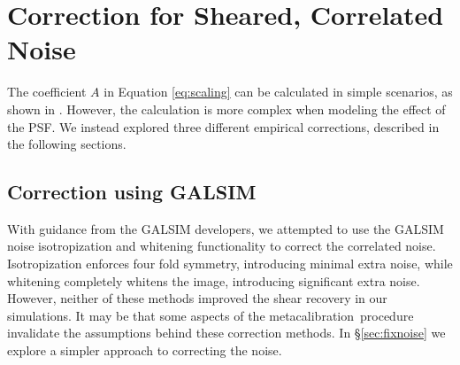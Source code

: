 \documentclass[usegraphicx,usenatbib]{mn2e}
\newcommand{\mcal}{metacalibration}
\newcommand{\mcalR}{$R$}
\begin{document}
\section{Correction for Sheared, Correlated Noise} \label{sec:corr}

The coefficient $A$ in Equation \ref{eq:scaling} can be calculated in simple
scenarios, as shown in \cite{HirataCorrNoise}.  However, the calculation is
more complex when modeling the effect of the PSF.  We instead explored three
different empirical corrections, described in the following sections.

\subsection{Correction using GALSIM}

With guidance from the GALSIM developers, we attempted to use the GALSIM noise
isotropization and whitening functionality to correct the correlated noise.
Isotropization enforces four fold symmetry, introducing minimal extra noise,
while whitening completely whitens the image, introducing significant extra
noise.  However, neither of these methods improved the shear recovery in our
simulations.  It may be that some aspects of the \mcal\ procedure invalidate
the assumptions behind these correction methods.  In \S \ref{sec:fixnoise} we
explore a simpler approach to correcting the noise.
\end{document}
